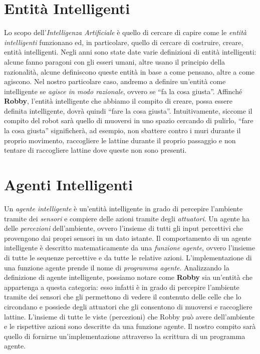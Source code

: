 \section{Entità Intelligenti}
Lo scopo dell'\textit{Intelligenza Artificiale} è quello di cercare di capire
come le \textit{entità intelligenti} funzionano ed, in particolare, quello di
cercare di costruire, creare, entità intelligenti.\newline
Negli anni sono state date varie definizioni di entità intelligenti: alcune
fanno paragoni con gli esseri umani, altre usano il principio della razionalità,
alcune definiscono queste entità in base a come pensano, altre a come agiscono.
Nel nostro particolare caso, andremo a definire un'entità come intelligente se
\textit{agisce in modo razionale}, ovvero se ``fa la cosa giusta''.\newline
Affinché \textbf{Robby}, l'entità intelligente che abbiamo il compito di
creare, possa essere definita intelligente, dovrà quindi ``fare la cosa
giusta''. Intuitivamente, siccome il compito del robot sarà quello di muoversi
in uno spazio cercando di pulirlo, ``fare la cosa giusta'' significherà, ad
esempio, non sbattere contro i muri durante il proprio movimento, raccogliere le
lattine durante il proprio passaggio e non tentare di raccogliere lattine dove
queste non sono presenti.

\section{Agenti Intelligenti}
Un \textit{agente intelligente} è un'entità intelligente in grado di percepire
l'ambiente tramite dei \textit{sensori} e compiere delle azioni tramite degli
\textit{attuatori}.\newline
Un agente ha delle \textit{percezioni} dell'ambiente, ovvero l'insieme di tutti
gli input percettivi che provengono dai propri sensori in un dato
istante.\newline
Il comportamento di un agente intelligente è descritto matematicamente da una
\textit{funzione agente}, ovvero l'insieme di tutte le sequenze percettive
e da tutte le relative azioni. L'implementazione di una funzione agente prende
il nome di \textit{programma agente}.\newline
Analizzando la definizione di agente intelligente, possiamo notare come
\textbf{Robby} sia un'entità che appartenga a questa categoria: esso infatti
è in grado di percepire l'ambiente tramite dei sensori che gli permettono di
vedere il contenuto delle celle che lo circondano e possiede degli attuatori che
gli consentono di muoversi e raccogliere lattine.\newline
L'insieme di tutte le viste (percezioni) che Robby può avere dell'ambiente e le
rispettive azioni sono descritte da una funzione agente. Il nostro compito sarà
quello di fornirne un'implementazione attraverso la scrittura di un programma
agente.

